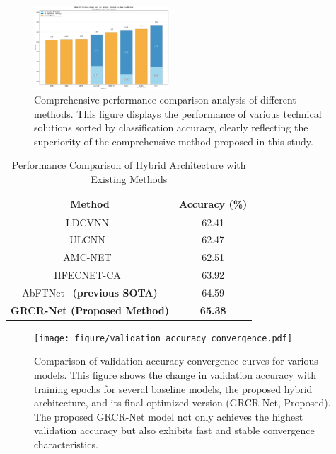 \documentclass[conference]{IEEEtran}
\begin{document}
\begin{figure}[htbp]
\centering
\includegraphics[width=0.45\textwidth]{figure/sorted_stacked_comparison.png}
\caption{Comprehensive performance comparison analysis of different methods. This figure displays the performance of various technical solutions sorted by classification accuracy, clearly reflecting the superiority of the comprehensive method proposed in this study.}
\label{fig:method_comparison}
\end{figure}

\begin{table}[!htbp]
\centering
\caption{Performance Comparison of Hybrid Architecture with Existing Methods}
\label{tab:hybrid_performance}
\begin{tabular}{@{}cc@{}}
\toprule
Method & Accuracy (\%) \\
\midrule
LDCVNN~\cite{xu2025ldcvnn} & 62.41 \\
ULCNN~\cite{guo2024ulcnn} & 62.47 \\
AMC-NET~\cite{zhang2023amcnet} & 62.51 \\
HFECNET-CA~\cite{ma2023hfecnetca} & 63.92 \\
AbFTNet~\cite{ning2024abftnet} \textbf{(previous SOTA)} & 64.59 \\
\textbf{GRCR-Net (Proposed Method)} & \textbf{65.38} \\
\bottomrule
\end{tabular}
\end{table}


\begin{figure}[htbp]
\centering
\texttt{[image: figure/validation\_accuracy\_convergence.pdf]}
\caption{Comparison of validation accuracy convergence curves for various models. This figure shows the change in validation accuracy with training epochs for several baseline models, the proposed hybrid architecture, and its final optimized version (GRCR-Net, Proposed). The proposed GRCR-Net model not only achieves the highest validation accuracy but also exhibits fast and stable convergence characteristics.}
\label{fig:training_convergence}
\end{figure}
\end{document}
